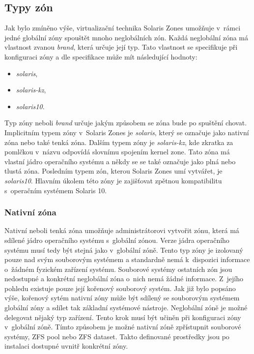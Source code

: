 \subsection{Typy zón}
\label{chapter:zones:types}
Jak bylo zmíněno výše, virtualizační technika Solaris Zones umožňuje v~rámci jedné globální zóny spouštět mnoho neglobálních
zón. Každá neglobální zóna má vlastnost zvanou \textit{brand}, která určuje její typ. Tato vlastnost se specifikuje
při konfiguraci zóny a dle specifikace \cite{oracle:solaris:zones:brands} může mít následující hodnoty:
\begin{itemize}
 \item \textit{solaris},
 \item \textit{solaris-kz},
 \item \textit{solaris10}.
\end{itemize}
Typ zóny neboli \textit{brand} určuje jakým způsobem se zóna bude po spuštění chovat. Implicitním typem zóny v~Solaris Zones
je \textit{solaris}, který se označuje jako nativní zóna nebo také tenká zóna. Dalším typem zóny je \textit{solaris-kz},
kde zkratka za pomlčkou v~názvu odpovídá slovnímu spojením kernel zone. Tato zóna má vlastní jádro
operačního systému a někdy se se také označuje jako plná nebo tlustá zóna. Posledním typem zón, kterou Solaris Zones umí vytvářet,
je \textit{solaris10}. Hlavním úkolem této zóny je zajišťovat zpětnou kompatibilitu s~operačním systémem Solaris 10.
\subsubsection{Nativní zóna}
\label{chapter:zones:types:native}
Nativní neboli tenká zóna umožňuje administrátorovi vytvořit zónu, která má sdílené jádro operačního systému s~globální zónou.
Verze jádra operačního systému musí tedy být stejná jako v~globální zóně. Tento typ zóny je izolovaný pouze nad svým
souborovým systémem a standardně nemá k~dispozici informace o~žádném fyzickém zařízení systému. Souborové systémy ostatních
zón jsou nedostupné a konkrétní neglobální zóna o~nich nemá žádné informace. Z~jejího pohledu existuje pouze její kořenový
souborový systém. Jak již bylo popsáno výše, kořenový sytém nativní zóny může být sdílený se souborovým systémem globální
zóny a sdílet tak základní systémové nástroje. Neglobální zóně je možné delegovat nějaký typ zařízení. Tento krok musí být
učiněn při konfiguraci zóny v~globální zóně. Tímto způsobem je možné nativní zóně zpřístupnit souborové systémy, ZFS pool nebo
ZFS dataset. Takto definované prostředky jsou po instalaci dostupné uvnitř konkrétní zóny.

